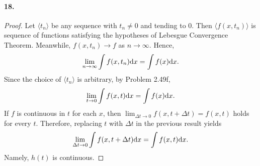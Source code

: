   \paragraph{18.}
  \begin{proof}
    Let $\langle t_n\rangle$ be any sequence with $t_n\ne 0$ and tending to $0$.
    Then $\langle f(x,t_n)\rangle$ is sequence of functions satisfying the 
    hypotheses of Lebesgue Convergence Theorem. Meanwhile, $f(x,t_n)\to f$ as 
    $n\to\infty$. Hence,
    \[
      \lim_{n\to\infty}\int f(x,t_n)\mathrm{d} x = \int f(x)\mathrm{d} x.
    \]
    Since the choice of $\langle t_n\rangle$ is arbitrary, by Problem 2.49f, 
    \[
      \lim_{t\to 0}\int f(x,t)\mathrm{d} x = \int f(x)\mathrm{d} x.
    \]
    If $f$ is continuous in $t$ for each $x$, then $\lim_{\Delta t\to 0}f(x,t+
    \Delta t)=f(x,t)$ holds for every $t$. Therefore, replacing $t$ with 
    $\Delta t$ in the previous result yields
    \[
      \lim_{\Delta t\to 0}\int f(x,t+\Delta t)\mathrm{d} x = \int f(x,t)\mathrm{d} x.
    \]
    Namely, $h(t)$ is continuous.
  \end{proof}

